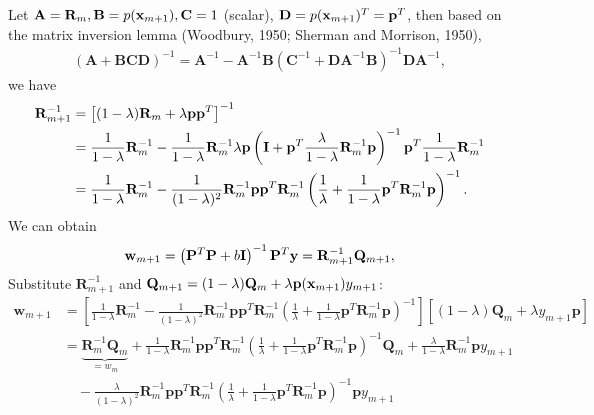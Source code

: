 Let \( \mathbf{A} = \mathbf{R}_m, \mathbf{B} = p({\mathbf{x}}_{m+1}), \mathbf{C} = 1 \) (scalar), \( \mathbf{D} = p({\mathbf{x}}_{m+1})^T = \mathbf{p}^T \), then based on the matrix inversion lemma (Woodbury, 1950; Sherman and Morrison, 1950),
\begin{align*}
	(\mathbf{A} + \mathbf{BCD})^{-1} = \mathbf{A}^{-1} - \mathbf{A}^{-1} \mathbf{B} (\mathbf{C}^{-1} + \mathbf{DA}^{-1} \mathbf{B})^{-1} \mathbf{DA}^{-1},
\end{align*}
we have
\begin{align*}
	\mathbf{R}_{m+1}^{-1} &= \left[ (1 - \lambda) \mathbf{R}_m + \lambda \mathbf{p}{\mathbf{p}}^T \right]^{-1}\\
						  &= \frac{1}{1 - \lambda} \mathbf{R}_m^{-1} - \frac{1}{1 - \lambda} \mathbf{R}_m^{-1}\lambda \mathbf{p} \left( \mathbf{I} + \mathbf{p}^T \frac{\lambda}{1-\lambda} \mathbf{R}_m^{-1} \mathbf{p} \right)^{-1} \mathbf{p}^T \frac{1}{1-\lambda} \mathbf{R}_m^{-1}\\
						  &= \frac{1}{1 - \lambda} \mathbf{R}_m^{-1} - \frac{1}{(1 - \lambda)^2} \mathbf{R}_m^{-1} \mathbf{pp}^T \mathbf{R}_m^{-1} \left( \frac{1}{\lambda} + \frac{1}{1-\lambda} \mathbf{p}^T \mathbf{R}_m^{-1} \mathbf{p} \right)^{-1}.
\end{align*}
We can obtain
\begin{align*}
	{\mathbf{w}}_{m+1} = \left( \mathbf{P}^T \mathbf{P} + b\mathbf{I} \right)^{-1} \mathbf{P}^T \mathbf{y} = \mathbf{R}_{m+1}^{-1} \mathbf{Q}_{m+1},
\end{align*}
Substitute \(\mathbf{R}_{m+1}^{-1}\) and \(\mathbf{Q}_{m+1} = (1 - \lambda) \mathbf{Q}_m +  \lambda\mathbf{p}({\mathbf{x}}_{m+1}) y_{m+1}\):
\begin{align*}
	\mathbf{w}_{m+1} &= \left[ \frac{1}{1 - \lambda} \mathbf{R}_m^{-1} - \frac{1}{(1 - \lambda)^2} \mathbf{R}_m^{-1} \mathbf{p}\mathbf{p}^T \mathbf{R}_m^{-1} \left( \frac{1}{\lambda} + \frac{1}{1 - \lambda} \mathbf{p}^T \mathbf{R}_m^{-1} \mathbf{p} \right)^{-1} \right] \left[ (1 - \lambda) \mathbf{Q}_m + \lambda y_{m+1} \mathbf{p} \right]\\
					 &= \underbrace{\mathbf{R}_m^{-1} \mathbf{Q}_m}_{=w_m} + \frac{1}{1 - \lambda}\mathbf{R}_m^{-1} \mathbf{p}\mathbf{p}^T \mathbf{R}_m^{-1} \left( \frac{1}{\lambda} + \frac{1}{1 - \lambda} \mathbf{p}^T \mathbf{R}_m^{-1} \mathbf{p} \right)^{-1} \mathbf{Q}_m + \frac{\lambda}{1 - \lambda} \mathbf{R}_m^{-1} \mathbf{p} y_{m+1} \\
					 &\quad - \frac{\lambda}{(1 - \lambda)^2}\mathbf{R}_m^{-1} \mathbf{p}\mathbf{p}^T \mathbf{R}_m^{-1} \left( \frac{1}{\lambda} + \frac{1}{1 - \lambda} \mathbf{p}^T \mathbf{R}_m^{-1} \mathbf{p} \right)^{-1}\mathbf{p} y_{m+1}\\
\end{align*}
